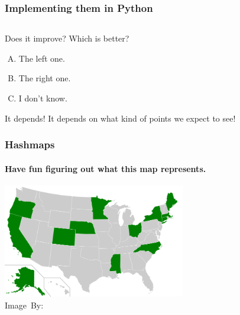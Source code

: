 \begin{frame}
	\frametitle{Implementing them in Python}
		\vspace{-10pt}
	\begin{columns}
			
		\pause
		
	\end{columns}
	\pause
		\vspace{-10pt}
	\begin{block}{Does it improve?}
		Which is better?	
		\vspace{-10pt}
		\begin{enumerate}[A.]
			\item The left one.
			\item The right one.
			\item I don't know.
		\end{enumerate}
	\end{block}
	\pause
		\vspace{-8pt}
		\begin{block}{It depends!}
			It depends on what kind of points we expect to see!
		\end{block}
\end{frame}


\begin{frame}
	\frametitle{Hashmaps}
	\framesubtitle{Have fun figuring out what this map represents.}
	\begin{center}
		\includegraphics[width=0.6\textwidth]{images/hashmap.png}\\
		\hspace*{15pt}\hbox{\scriptsize Image By:}
	\end{center}
\end{frame}

